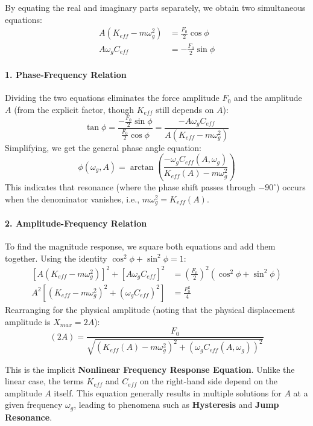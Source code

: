 \documentclass[10pt,twoside]{report}
\begin{document}
By equating the real and imaginary parts separately, we obtain two simultaneous equations:
\begin{align*}
    A(K_{eff} - m\omega_g^2) &= \frac{F_0}{2} \cos\phi \\
    A \omega_g C_{eff} &= -\frac{F_0}{2} \sin\phi
\end{align*}

\paragraph{1. Phase-Frequency Relation}
Dividing the two equations eliminates the force amplitude $F_0$ and the amplitude $A$ (from the explicit factor, though $K_{eff}$ still depends on $A$):
\begin{equation*}
    \tan\phi = \frac{-\frac{F_0}{2} \sin\phi}{\frac{F_0}{2} \cos\phi} = \frac{-A \omega_g C_{eff}}{A(K_{eff} - m\omega_g^2)}
\end{equation*}
Simplifying, we get the general phase angle equation:
\begin{equation}
    \phi(\omega_g, A) = \arctan\left( \frac{-\omega_g C_{eff}(A, \omega_g)}{K_{eff}(A) - m\omega_g^2} \right)
\end{equation}
This indicates that resonance (where the phase shift passes through $-90^\circ$) occurs when the denominator vanishes, i.e., $m\omega_g^2 = K_{eff}(A)$.

\paragraph{2. Amplitude-Frequency Relation}
To find the magnitude response, we square both equations and add them together. Using the identity $\cos^2\phi + \sin^2\phi = 1$:
\begin{align*}
    \left[ A(K_{eff} - m\omega_g^2) \right]^2 + \left[ A \omega_g C_{eff} \right]^2 &= \left( \frac{F_0}{2} \right)^2 (\cos^2\phi + \sin^2\phi) \\
    A^2 \left[ (K_{eff} - m\omega_g^2)^2 + (\omega_g C_{eff})^2 \right] &= \frac{F_0^2}{4}
\end{align*}
Rearranging for the physical amplitude (noting that the physical displacement amplitude is $X_{max} = 2A$):
\begin{equation}
\label{eq:amp_response}
    (2A) = \frac{F_0}{\sqrt{(K_{eff}(A) - m\omega_g^2)^2 + (\omega_g C_{eff}(A, \omega_g))^2}}
\end{equation}

This is the implicit \textbf{Nonlinear Frequency Response Equation}. Unlike the linear case, the terms $K_{eff}$ and $C_{eff}$ on the right-hand side depend on the amplitude $A$ itself. This equation generally results in multiple solutions for $A$ at a given frequency $\omega_g$, leading to phenomena such as \textbf{Hysteresis} and \textbf{Jump Resonance}.
\end{document}
